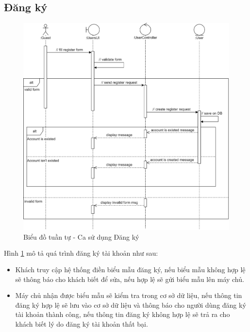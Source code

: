 \documentclass[./../main.tex]{subfiles}
\begin{document}
\subsection{Đăng ký}
\begin{figure}[H]
	\centering
	\includegraphics[width=\linewidth]{./img/uc1.png}
    \caption{\label{tab:seq-uc1}Biểu đồ tuần tự - Ca sử dụng Đăng ký}
\end{figure}
Hình \ref{tab:seq-uc1} mô tả quá trình đăng ký tài khoản như sau:
\begin{itemize}
    \item Khách truy cập hệ thống điền biểu mẫu đăng ký, nếu biểu mẫu không hợp lệ sẽ thông báo cho khách biết để sửa, nếu hợp lệ sẽ gửi biểu mẫu lên máy chủ.
    \item Máy chủ nhận được biểu mẫu sẽ kiểm tra trong cơ sở dữ liệu, nếu thông tin đăng ký hợp lệ sẽ lưu vào cơ sở dữ liệu và thông báo cho người dùng đăng ký tài khoản thành công, nếu thông tin đăng ký không hợp lệ sẽ trả ra cho khách biết lý do đăng ký tài khoản thất bại.
\end{itemize}
\end{document}
